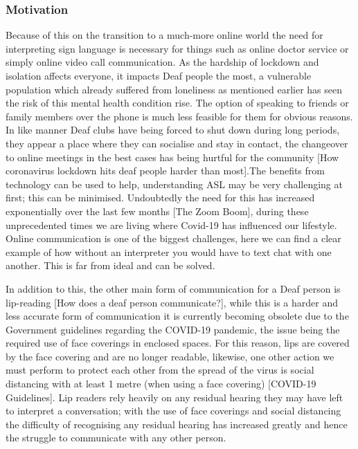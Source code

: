 \documentclass[10pt]{article}
\begin{document}
  \subsubsection{Motivation}

  Because of this on the transition to a much-more online world the need for interpreting sign 
  language is necessary for things such as online doctor service or simply online video call 
  communication. As the hardship of lockdown and isolation affects everyone, it impacts Deaf people 
  the most, a vulnerable population which already suffered from loneliness as mentioned earlier has 
  seen the risk of this mental health condition rise. The option of speaking to friends or family 
  members over the phone is much less feasible for them for obvious reasons. In like manner Deaf 
  clubs have being forced to shut down during long periods, they appear a place where they can 
  socialise and stay in contact, the changeover to online meetings in the best cases has being 
  hurtful for the community [How coronavirus lockdown hits deaf people harder than most].The 
  benefits from technology can be used to help, understanding ASL may be very challenging at first; 
  this can be minimised. Undoubtedly the need for this has increased exponentially over the last few 
  months [The Zoom Boom], during these unprecedented times we are living where Covid-19 has 
  influenced our lifestyle. Online communication is one of the biggest challenges, here we can find 
  a clear example of how without an interpreter you would have to text chat with one another. This 
  is far from ideal and can be solved.

  In addition to this, the other main form of communication for a Deaf person is lip-reading [How 
  does a deaf person communicate?], while this is a harder and less accurate form of communication 
  it is currently becoming obsolete due to the Government guidelines regarding the COVID-19 
  pandemic, the issue being the required use of face coverings in enclosed spaces. For this reason, 
  lips are covered by the face covering and are no longer readable, likewise, one other action we 
  must perform to protect each other from the spread of the virus is social distancing with at least 
  1 metre (when using a face covering) [COVID-19 Guidelines]. Lip readers rely heavily on any 
  residual hearing they may have left to interpret a conversation; with the use of face coverings 
  and social distancing the difficulty of recognising any residual hearing has increased greatly and 
  hence the struggle to communicate with any other person. 
\end{document}
